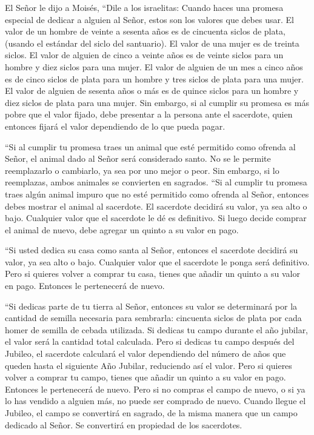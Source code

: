 El Señor le dijo a Moisés,  ``Dile a los
israelitas: Cuando haces una promesa especial de dedicar a alguien al
Señor, estos son los valores que debes usar.  El valor de
un hombre de veinte a sesenta años es de cincuenta siclos de plata,
(usando el estándar del siclo del santuario).  El valor de
una mujer es de treinta siclos.  El valor de alguien de
cinco a veinte años es de veinte siclos para un hombre y diez siclos
para una mujer.  El valor de alguien de un mes a cinco
años es de cinco siclos de plata para un hombre y tres siclos de plata
para una mujer.  El valor de alguien de sesenta años o más
es de quince siclos para un hombre y diez siclos de plata para una
mujer.  Sin embargo, si al cumplir su promesa es más pobre
que el valor fijado, debe presentar a la persona ante el sacerdote,
quien entonces fijará el valor dependiendo de lo que pueda pagar.

 ``Si al cumplir tu promesa traes un animal que esté
permitido como ofrenda al Señor, el animal dado al Señor será
considerado santo.  No se le permite reemplazarlo o
cambiarlo, ya sea por uno mejor o peor. Sin embargo, si lo reemplazas,
ambos animales se convierten en sagrados.  ``Si al
cumplir tu promesa traes algún animal impuro que no esté permitido como
ofrenda al Señor, entonces debes mostrar el animal al sacerdote.
 El sacerdote decidirá su valor, ya sea alto o bajo.
Cualquier valor que el sacerdote le dé es definitivo.  Si
luego decide comprar el animal de nuevo, debe agregar un quinto a su
valor en pago.

 ``Si usted dedica su casa como santa al Señor, entonces
el sacerdote decidirá su valor, ya sea alto o bajo. Cualquier valor que
el sacerdote le ponga será definitivo.  Pero si quieres
volver a comprar tu casa, tienes que añadir un quinto a su valor en
pago. Entonces le pertenecerá de nuevo.

 ``Si dedicas parte de tu tierra al Señor, entonces su
valor se determinará por la cantidad de semilla necesaria para
sembrarla: cincuenta siclos de plata por cada homer de semilla de cebada
utilizada.  Si dedicas tu campo durante el año jubilar,
el valor será la cantidad total calculada.  Pero si
dedicas tu campo después del Jubileo, el sacerdote calculará el valor
dependiendo del número de años que queden hasta el siguiente Año
Jubilar, reduciendo así el valor.  Pero si quieres volver
a comprar tu campo, tienes que añadir un quinto a su valor en pago.
Entonces le pertenecerá de nuevo.  Pero si no compras el
campo de nuevo, o si ya lo has vendido a alguien más, no puede ser
comprado de nuevo.  Cuando llegue el Jubileo, el campo se
convertirá en sagrado, de la misma manera que un campo dedicado al
Señor. Se convertirá en propiedad de los sacerdotes.

